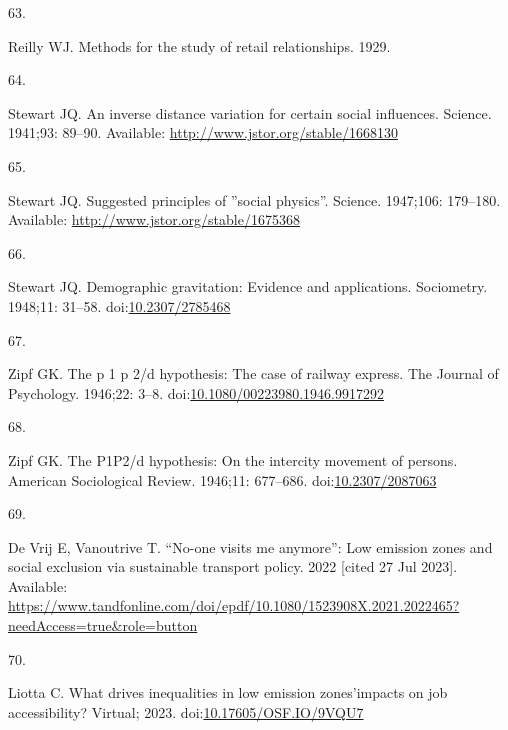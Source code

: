 \documentclass[10pt,letterpaper]{article}
\newlength{\cslhangindent}
\newlength{\csllabelwidth}
\newlength{\cslentryspacingunit} %
\newenvironment{CSLReferences}[2] %
 {%
  \setlength{\parindent}{0pt}
  \ifodd #1
  \let\oldpar\par
  \def\par{\hangindent=\cslhangindent\oldpar}
  \fi
  \setlength{\parskip}{#2\cslentryspacingunit}
 }%
 {}
\newcommand{\CSLLeftMargin}[1]{\parbox[t]{\csllabelwidth}{#1}}
\newcommand{\CSLRightInline}[1]{\parbox[t]{\linewidth - \csllabelwidth}{#1}\break}
\begin{document}
\begin{CSLReferences}{0}{0}
\leavevmode{}%
\CSLLeftMargin{63. }%
\CSLRightInline{Reilly WJ. Methods for the study of retail
relationships. 1929. }

\leavevmode{}%
\CSLLeftMargin{64. }%
\CSLRightInline{Stewart JQ. An inverse distance variation for certain
social influences. Science. 1941;93: 89--90. Available:
\url{http://www.jstor.org/stable/1668130}}

\leavevmode{}%
\CSLLeftMargin{65. }%
\CSLRightInline{Stewart JQ. Suggested principles of ''social physics''.
Science. 1947;106: 179--180. Available:
\url{http://www.jstor.org/stable/1675368}}

\leavevmode{}%
\CSLLeftMargin{66. }%
\CSLRightInline{Stewart JQ. Demographic gravitation: Evidence and
applications. Sociometry. 1948;11: 31--58.
doi:\href{https://doi.org/10.2307/2785468}{10.2307/2785468}}

\leavevmode{}%
\CSLLeftMargin{67. }%
\CSLRightInline{Zipf GK. The p 1 p 2/d hypothesis: The case of railway
express. The Journal of Psychology. 1946;22: 3--8.
doi:\href{https://doi.org/10.1080/00223980.1946.9917292}{10.1080/00223980.1946.9917292}}

\leavevmode{}%
\CSLLeftMargin{68. }%
\CSLRightInline{Zipf GK. The P1P2/d hypothesis: On the intercity
movement of persons. American Sociological Review. 1946;11: 677--686.
doi:\href{https://doi.org/10.2307/2087063}{10.2307/2087063}}

\leavevmode{}%
\CSLLeftMargin{69. }%
\CSLRightInline{De Vrij E, Vanoutrive T. {``No-one visits me anymore''}:
Low emission zones and social exclusion via sustainable transport
policy. 2022 {[}cited 27 Jul 2023{]}. Available:
\url{https://www.tandfonline.com/doi/epdf/10.1080/1523908X.2021.2022465?needAccess=true\&role=button}}

\leavevmode{}%
\CSLLeftMargin{70. }%
\CSLRightInline{Liotta C. What drives inequalities in low emission
zones'impacts on job accessibility? Virtual; 2023.
doi:\href{https://doi.org/10.17605/OSF.IO/9VQU7}{10.17605/OSF.IO/9VQU7}}

\end{CSLReferences}

\nolinenumbers
\end{document}
